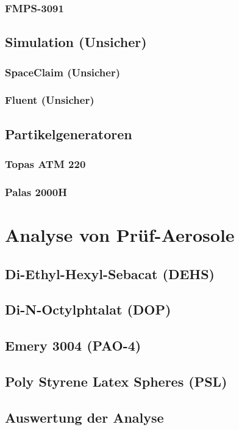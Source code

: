 \subsection{FMPS-3091}

\section{Simulation (Unsicher)}
\subsection{SpaceClaim (Unsicher)}
\subsection{Fluent (Unsicher)}

\section{Partikelgeneratoren}
\subsection{Topas ATM 220}
\subsection{Palas 2000H}


\chapter{Analyse von Pr\"{u}f-Aerosole}\label{ch:work}
\section{Di-Ethyl-Hexyl-Sebacat (DEHS)}
\section{Di-N-Octylphtalat (DOP)}
\section{Emery 3004 (PAO-4)}
\section{Poly Styrene Latex Spheres (PSL)}
\section{Auswertung der Analyse}
